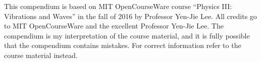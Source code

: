 This compendium is based on MIT OpenCourseWare course ``Physics III: Vibrations and Waves'' in the fall of 2016 by Professor Yen-Jie Lee. All credits go to MIT OpenCourseWare and the excellent Professor Yen-Jie Lee.
The compendium is my interpretation of the course material, and it is fully possible that the compendium contains mistakes. For correct information refer to the course material instead.
